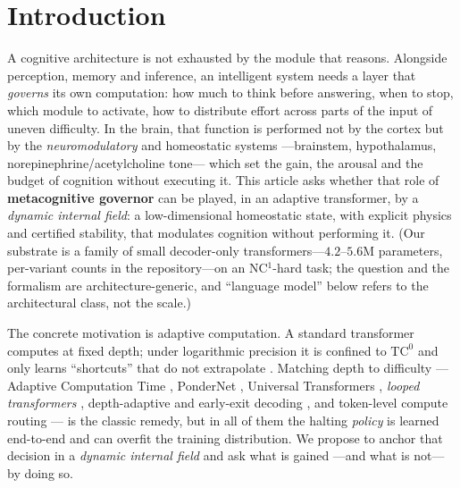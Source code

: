 \documentclass{article}
\begin{document}
\begin{abstract}
field's spectral radius is read off directly. We conclude that a dynamic internal field is a viable and
certifiable \emph{compute governor} ---the ``brainstem'' of a cognitive
architecture--- but not an enhancer of cognition: it modulates, it does not
think. A kill-gate with a positively controlled probe finds no evidence for
the remaining route---the field as temporal evidence accumulator---on twelve
frozen solvers of a companion substrate ($\Delta\mathrm{AUC}=+0.0007$
$[-0.0065,+0.0079]$ against a $0.03$ pass threshold); we read this as the
recurrent state already integrating its own history, a mechanism we propose
rather than demonstrate. The null, broad and with a mechanism, delimits which
role a homeostatic field can and cannot play in an adaptive transformer.
\end{abstract}

\section{Introduction}
A cognitive architecture is not exhausted by the module that reasons. Alongside
perception, memory and inference, an intelligent system needs a layer that
\emph{governs} its own computation: how much to think before answering, when to
stop, which module to activate, how to distribute effort across parts of the
input of uneven difficulty. In the brain, that function is performed not by the
cortex but by the \emph{neuromodulatory} and homeostatic systems ---brainstem,
hypothalamus, norepinephrine/acetylcholine tone--- which set the gain, the
arousal and the budget of cognition without executing it. This article asks
whether that role of \textbf{metacognitive governor} can be played, in an
adaptive transformer, by a \emph{dynamic internal field}: a low-dimensional
homeostatic state, with explicit physics and certified stability, that
modulates cognition without performing it. (Our substrate is a family of
small decoder-only transformers---$4.2$--$5.6$M parameters, per-variant
counts in the repository---on an
NC$^1$-hard task; the question and the formalism are architecture-generic,
and ``language model'' below refers to the architectural class, not the
scale.)

The concrete motivation is adaptive computation. A standard transformer computes
at fixed depth; under logarithmic precision it is confined to $\mathrm{TC}^0$
\citep{merrill2023parallelism} and only learns ``shortcuts'' that do not
extrapolate \citep{liu2023shortcuts}. Matching depth to difficulty ---Adaptive
Computation Time \citep{graves2016act}, PonderNet \citep{banino2021pondernet},
Universal Transformers \citep{dehghani2019universal}, \emph{looped transformers}
\citep{fan2025looped}, depth-adaptive and early-exit decoding
\citep{elbayad2020depth,schwartz2020right}, and token-level compute routing
\citep{raposo2024mixture}--- is the classic remedy, but in all of them the halting
\emph{policy} is learned end-to-end and can overfit the training distribution.
We propose to anchor that decision in a \emph{dynamic internal field} and ask
what is gained ---and what is not--- by doing so.
\end{document}
